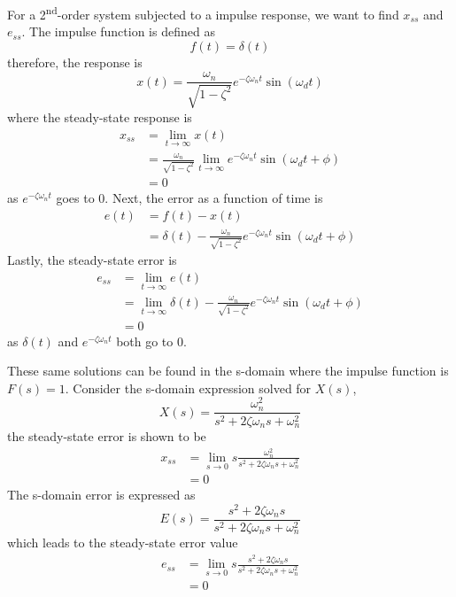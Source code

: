 \documentclass[12pt,letter]{article}
\begin{document}
For a 2\textsuperscript{nd}-order system subjected to a impulse response, we want to find $x_{ss}$ and $e_{ss}$. The impulse function is defined as
\begin{equation}
f(t) = \delta(t)
\end{equation}
therefore, the response is
\begin{equation}
x(t) = \frac{\omega_n}{\sqrt{1-\zeta^2}} e ^{-\zeta \omega_n t} \sin(\omega_d t)
\end{equation}
where the steady-state response is
\begin{align}
x_{ss} &= \lim\limits_{t \rightarrow \infty} x(t)\\
&= \frac{\omega_n}{\sqrt{1-\zeta^2}}  \lim\limits_{t \rightarrow \infty}  e^{-\zeta \omega_n t} \sin (\omega_d t + \phi) \nonumber \\
&=  0 \nonumber
\end{align}
as $e^{-\zeta \omega_n t} $ goes to 0. Next, the error as a function of time is 
\begin{align}
e(t) &= f(t) - x(t) \\
&= \delta (t) - \frac{\omega_n}{\sqrt{1-\zeta^2}} e^{-\zeta \omega_n t} \sin (\omega_d t + \phi) \nonumber
\end{align}
Lastly, the steady-state error is
\begin{align}
e_{ss} &= \lim\limits_{t \rightarrow \infty} e(t) \\
&= \lim\limits_{t \rightarrow \infty} \delta (t) - \frac{\omega_n}{\sqrt{1-\zeta^2}} e^{-\zeta \omega_n t} \sin (\omega_d t + \phi) \nonumber \\
&= 0 \nonumber
\end{align}
as $\delta(t)$ and $e^{-\zeta \omega_n t}$ both go to 0. 

These same solutions can be found in the s-domain where the impulse function is $F(s)=1$. Consider the s-domain expression solved for $X(s)$, 
\begin{equation}
X(s) = \frac{\omega_n^2}{s^2 + 2 \zeta \omega_n s + \omega_n^2} 
\end{equation}
the steady-state error is shown to be
\begin{align}
x_{ss} &= \lim\limits_{s \rightarrow 0} s \frac{\omega_n^2}{s^2 + 2 \zeta \omega_n s + \omega_n^2}  \\
&= 0    \nonumber 
\end{align}
The s-domain error is expressed as
\begin{equation}
E(s) = \frac{s^2 + 2 \zeta \omega_n s}{s^2 + 2 \zeta \omega_n s + \omega_n^2}
\end{equation}
which leads to the steady-state error value
\begin{align}
e_{ss} &= \lim\limits_{s \rightarrow 0}  s \frac{s^2 + 2 \zeta \omega_n s}{s^2 + 2 \zeta \omega_n s + \omega_n^2} \\
&= 0   \nonumber 
\end{align}
\end{document}
